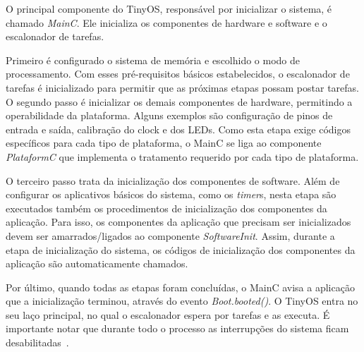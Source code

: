 O principal componente do TinyOS, responsável por inicializar o sistema, é chamado \textit{MainC}. 
Ele inicializa os componentes de hardware e software e o escalonador de tarefas. 

Primeiro é configurado o sistema de memória e escolhido o modo de processamento. 
Com esses pré-requisitos básicos estabelecidos,  o escalonador de tarefas é inicializado 
para permitir que as próximas etapas possam postar tarefas.
O segundo passo é inicializar os demais componentes de hardware, permitindo a operabilidade da plataforma.
Alguns exemplos são configuração de pinos de entrada e saída, calibração do clock e dos LEDs.
Como esta etapa exige códigos específicos para cada tipo de plataforma, o MainC se liga ao componente
\textit{PlataformC} que implementa o tratamento requerido por cada tipo de plataforma.

O terceiro passo trata da inicialização dos componentes de software. 
Além de configurar os aplicativos básicos do sistema, como
os \textit{timer}s, nesta etapa são executados também os procedimentos de inicialização dos componentes 
da aplicação. Para isso, os componentes da aplicação que precisam ser inicializados devem ser amarrados/ligados ao componente 
{\em SoftwareInit}. Assim, durante a etapa de inicialização do sistema, os códigos de inicialização dos componentes da
aplicação são automaticamente chamados.

Por último, quando todas as etapas foram concluídas, o MainC avisa a aplicação que a inicialização terminou, através do
evento \textit{Boot.booted()}. O TinyOS entra no
seu laço principal, no qual o escalonador espera por tarefas e as executa. É importante notar que
durante todo o processo as interrupções do sistema ficam desabilitadas~\cite{TEP107}.


